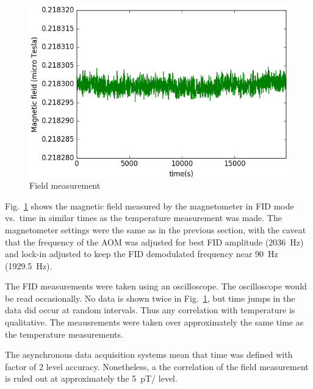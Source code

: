 
\begin{figure}%
\centering\includegraphics[width=0.8\linewidth]{figures/field_.png}
\caption{Field measurement\label{fig:field}}
\end{figure}

Fig.~\ref{fig:field} shows the magnetic field measured by the
magnetometer in FID mode vs.~time in similar times as the temperature
measurement was made.  The magnetometer settings were the same as in
the previous section, with the caveat that the frequency of the AOM
was adjusted for best FID amplitude (2036~Hz) and lock-in adjusted to
keep the FID demodulated frequency near 90~Hz (1929.5~Hz).

The FID measurements were taken using an oscilloscope.  The
oscilloscope would be read occasionally.  No data is shown twice in
Fig.~\ref{fig:field}, but time jumps in the data did occur at random
intervals.  Thus any correlation with temperature is qualitative.  The
meausrements were taken over approximately the same time as the
temperature measurements.

The asynchronous data acquisition systems mean that time was defined
with factor of 2 level accuracy.  Nonetheless, a the correlation of
the field measurement is ruled out at approximately the
5~pT/ level.




